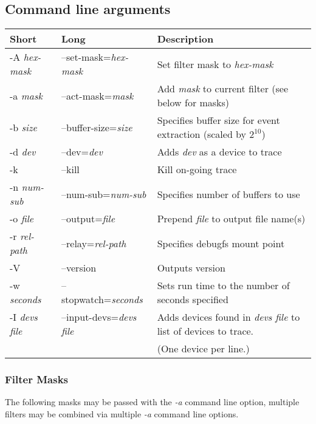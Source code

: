 \documentclass{article}
\begin{document}
\subsection{\label{sec:blktrace-args}Command line arguments}
\begin{tabular}{|l|l|l|}\hline
Short              & Long                       & Description \\ \hline\hline
-A \emph{hex-mask} & --set-mask=\emph{hex-mask} & Set filter mask to \emph{hex-mask} \\ \hline
-a \emph{mask}     & --act-mask=\emph{mask}     & Add \emph{mask} to current filter (see below for masks) \\ \hline
-b \emph{size}     & --buffer-size=\emph{size}  & Specifies buffer size for event extraction (scaled by $2^{10}$) \\ \hline
-d \emph{dev}      & --dev=\emph{dev}           & Adds \emph{dev} as a device to trace \\ \hline
-k                 & --kill                     & Kill on-going trace \\ \hline
-n \emph{num-sub}  & --num-sub=\emph{num-sub}   & Specifies number of buffers to use \\ \hline
-o \emph{file}     & --output=\emph{file}       & Prepend \emph{file} to output file name(s) \\ \hline
-r \emph{rel-path} & --relay=\emph{rel-path}    & Specifies debugfs mount point \\ \hline
-V                 & --version                  & Outputs version \\ \hline
-w \emph{seconds}  & --stopwatch=\emph{seconds} & Sets run time to the number of seconds specified \\ \hline
-I \emph{devs file}& --input-devs=\emph{devs file}& Adds devices found in \emph{devs file} to list of devices to trace. \\
                   &                              & (One device per line.) \\ \hline
\end{tabular}

\subsubsection{\label{sec:filter-mask}Filter Masks}
The following masks may be passed with the \emph{-a} command line
option, multiple filters may be combined via multiple \emph{-a} command
line options.\smallskip
\end{document}
